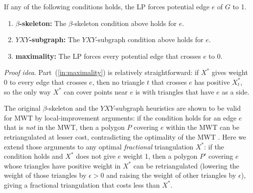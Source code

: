 \documentclass[final]{siamltex}
\newcommand{\edge}{e}
\newcommand{\graph}{G}
\newcommand{\polygon}{P}
\newcommand{\tri}{t}  \newcommand{\vertex}{v}
\newcommand{\fracTriang}{X}
\newcommand{\YXY}{YXY\xspace}
\newenvironment{proofidea}{\par{\it Proof idea}. \ignorespaces}{}
\begin{document}
\begin{lemma}\label{lemma:in}
  If any of the following conditions holds, the LP forces potential edge $\edge$ of $\graph$ to 1.
  \begin{enumerate}
  \item \label{in:beta}
    {\bf $\beta$-skeleton:} The $\beta$-skeleton condition above holds for $\edge$.
\item \label{in:YXY}
    {\bf $\YXY$-subgraph:} The $\YXY$-subgraph condition above holds for $\edge$.
\item \label{in:maximality}
    {\bf maximality:}
    The LP forces every potential edge that crosses $\edge$ to 0.
  \end{enumerate}
\end{lemma}

\begin{proofidea}
  Part~(\ref{in:maximality}) is relatively straightforward:
  if $\fracTriang^*$ gives weight 0 to every edge that crosses $\edge$,
  then no triangle $\tri$ that crosses $\edge$ has positive $\fracTriang^*_\tri$, 
  so the only way $\fracTriang^*$ can cover points near $\edge$ is with triangles that have $\edge$ as a side.

  The original $\beta$-skeleton and the $\YXY$-subgraph heuristics 
  are shown to be valid for MWT by local-improvement arguments:
  if the condition holds for an edge $\edge$ that is {\em not} in the MWT,
 then a polygon $\polygon$ covering $\edge$ within the MWT can be retriangulated at lesser cost,
  contradicting the optimality of the MWT
  \cite{keil1994computing,cheng1996approaching,yang1994chain,gilbert1979new}.
Here we extend those arguments to any optimal {\em fractional} triangulation $\fracTriang^*$:
  if the condition holds and $\fracTriang^*$ does not give $\edge$ weight 1,
  then a polygon $\polygon'$ covering $\edge$ whose triangles have positive weight in $\fracTriang^*$
  can be retriangulated (lowering the weight of those triangles by $\epsilon>0$
  and raising the weight of other triangles by $\epsilon$),
  giving a fractional triangulation that costs less than $\fracTriang^*$.


\end{proofidea}
\end{document}
